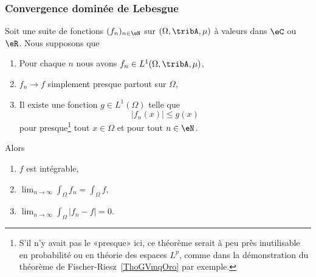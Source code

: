 \subsubsection{Convergence dominée de Lebesgue}

\begin{theorem}        \label{ThoConvDomLebVdhsTf}
    Soit une suite de fonctions \( (f_n)_{n\in \eN}\) sur \( (\Omega,\tribA,\mu)\) à valeurs dans \( \eC\) ou \( \eR\). Nous supposons que
    \begin{enumerate}
        \item
            Pour chaque \( n\) nous avons \( f_n\in L^1(\Omega,\tribA,\mu)\),
        \item
            \( f_n\to f\) simplement presque partout sur \( \Omega\),
        \item 
            Il existe une fonction \( g\in L^1(\Omega)\) telle que
            \begin{equation}
                | f_n(x) | \leq g(x)
            \end{equation}
            pour presque\footnote{S'il n'y avait pas le «presque» ici, ce théorème serait à peu près inutilisable en probabilité ou en théorie des espaces \( L^p\), comme dans la démonstration du théorème de Fischer-Riesz~\ref{ThoGVmqOro} par exemple.} tout \( x\in\Omega\) et pour tout \( n\in \eN\). 
    \end{enumerate}
    Alors
    \begin{enumerate}
        \item
            \( f\) est intégrable,
        \item
           $\lim_{n\to \infty} \int_{\Omega}f_n=\int_\Omega f$,
        \item
            $\lim_{n\to \infty} \int_{\Omega}| f_n-f |=0$.
    \end{enumerate}
\end{theorem}

